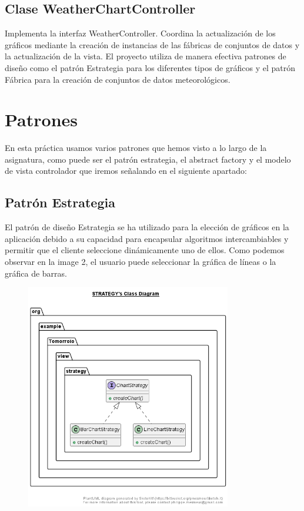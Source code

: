 \documentclass{article}
\begin{document}
\subsection{Clase WeatherChartController}
Implementa la interfaz WeatherController. Coordina la actualización de los gráficos mediante la creación de instancias de las fábricas de conjuntos de datos y la actualización de la vista. El proyecto utiliza de manera efectiva patrones de diseño como el patrón Estrategia para los diferentes tipos de gráficos y el patrón Fábrica para la creación de conjuntos de datos meteorológicos.

\section{Patrones}
En esta práctica usamos varios patrones que hemos visto a lo largo de la asignatura, como puede ser el patrón estrategia, el abstract factory y el modelo de vista controlador que iremos señalando en el siguiente apartado:

\subsection{Patrón Estrategia}
El patrón de diseño Estrategia se ha utilizado para la elección de gráficos en la aplicación debido a su capacidad para encapsular algoritmos intercambiables y permitir que el cliente seleccione dinámicamente uno de ellos. Como podemos observar en la image 2, el usuario puede seleccionar la gráfica de líneas o la gráfica de barras.

\begin{figure}[H]
  \centering
  \includegraphics[width=0.8\textwidth]{images/image2.png}
  \label{fig:image2}
\end{figure}
\end{document}
